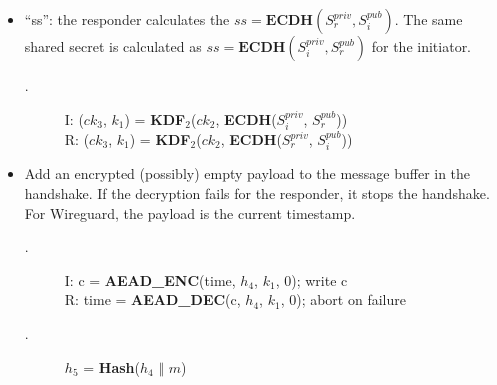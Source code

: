 \begin{enumerate} [start = \value{msg}]
\begin{itemize}
    \item ``ss'':  the responder calculates the $ss = \textbf{ECDH}(S^{priv}_r, S^{pub}_i)$. The
    same shared secret is calculated as $ss = \textbf{ECDH}(S^{priv}_i, S^{pub}_r)$ for the initiator.
      \begin{center}
        \begin{varwidth}{\textwidth}
          \begin{description}
          \item[\textnormal{}.] 
                I: ($ck_3$, $k_1$) = \textbf{KDF}$_2$($ck_2$, \textbf{ECDH}($S^{priv}_i$, $S^{pub}_r$)) \\
                R: ($ck_3$, $k_1$) = \textbf{KDF}$_2$($ck_2$, \textbf{ECDH}($S^{priv}_r$, $S^{pub}_i$))
          \addtocounter{cnt}{1}
          \end{description}
        \end{varwidth}
      \end{center}
    \item Add an encrypted (possibly) empty payload to the message buffer in the handshake. If the
    decryption fails for the responder, it stops the handshake. For Wireguard, the payload is
    the current timestamp.
    \begin{center}
      \begin{varwidth}{\textwidth}
        \begin{description}
        \item[\textnormal{}.] 
              I: c = \textbf{AEAD{\_}ENC}(time, $h_4$, $k_1$, 0); write c \\
              R: time = \textbf{AEAD{\_}DEC}(c, $h_4$, $k_1$, 0); abort on failure
        \addtocounter{cnt}{1}
        \item[\textnormal{}.] $h_5$ = \textbf{Hash}($h_4$ $\Vert$ $m$)
        \addtocounter{cnt}{1}
        \end{description}
      \end{varwidth}
    \end{center}
  \end{itemize}
  \end{enumerate}


